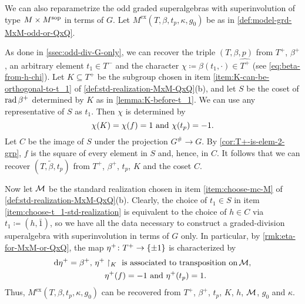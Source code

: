 We can also reparametrize the odd graded superalgebras with superinvolution of type $M\times M^{\mathrm{sop}}$ in terms of $G$. 
Let $M^{\mathrm{ex}}(T, \beta, t_p, \kappa, g_0)$ be as in \cref{def:model-grd-MxM-odd-or-QxQ}. 

As done in \cref{ssec:odd-div-G-only}, we can recover the triple $(T, \beta, p)$ from $T^+$, $\beta^+$, an arbitrary element $t_1 \in T^-$ and the character $\chi \coloneqq \beta(t_1, \cdot) \in \widehat{T^+}$ (see \cref{eq:beta-from-h-chi}). 
Let $K \subseteq T^+$ be the subgroup chosen in item \eqref{item:K-can-be-orthogonal-to-t_1} of \cref{def:std-realization-MxM-QxQ}(b), and let $S$ be the coset of $\operatorname{rad} \beta^+$ determined by $K$ as in \cref{lemma:K-before-t_1}. 
We can use any representative of $S$ as $t_1$. 
Then $\chi$ is determined by
\[\label{eq:equivalent-def-of-chi}
    \chi(K) = \chi(f) = 1 \,\,\text{and}\,\, \chi(t_p) = -1.
\]
Let $C$ be the image of $S$ under the projection $G^\# \to G$. 
By \cref{cor:T+-is-elem-2-grp}, $f$ is the square of every element in $S$ and, hence, in $C$.
It follows that we can recover $(T, \tilde\beta, t_p)$ from $T^+$, $\beta^+$, $t_p$, $K$ and the coset $C$. 

Now let $\mathcal M$ be the standard realization chosen in item \eqref{item:choose-mc-M} of \cref{def:std-realization-MxM-QxQ}(b). 
Clearly, the choice of $t_1 \in S$ in item \eqref{item:choose-t_1-std-realization} is equivalent to the choice of $h\in C$ via $t_1 \coloneqq (h, \bar 1)$, so we have all the data necessary to construct a graded-division superalgebra with superinvolution in terms of $G$ only. 
In particular, by \cref{rmk:eta-for-MxM-or-QxQ}, the map $\eta^+\colon T^+ \to \{ \pm 1 \}$ is characterized by
\[\label{eq:eta+-unsharpening-MxM}
    \begin{aligned}
        \mathrm{d}\eta^+ = \beta^+,\, \eta^+&\restriction_{K} \,\, \text{is associated to transposition on}\, \mathcal M,\\ 
        &\eta^+(f) = -1 \,\,\text{and}\,\, \eta^+(t_p) =1. 
    \end{aligned}
\]
Thus, $M^{\mathrm{ex}}(T, \beta, t_p, \kappa, g_0)$ can be recovered from $T^+$, $\beta^+$, $t_p$, $K$, $h$, $\mathcal M$, $g_0$ and $\kappa$. 



